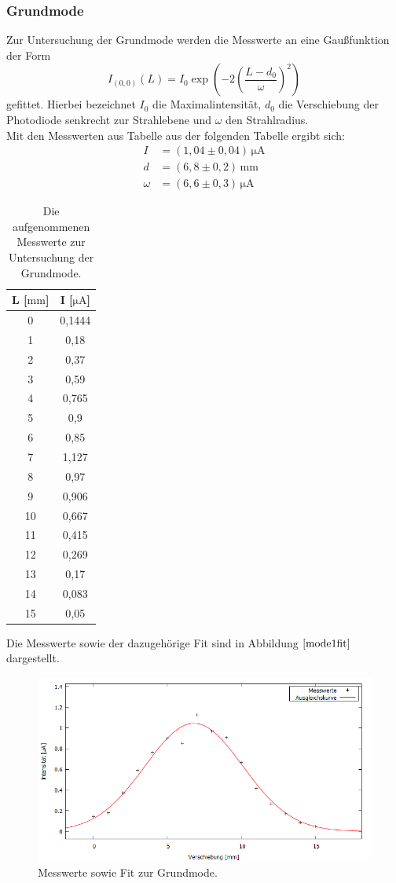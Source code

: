 \subsubsection{Grundmode}
Zur Untersuchung der Grundmode werden die Messwerte an eine Gaußfunktion der Form
\begin{equation}
\label{eqn:gauß}
  I_{(0, 0)}(L) = I_0\exp\left(-2\left(\frac{L - d_0}{\omega}\right)^2\right)
\end{equation}
gefittet. Hierbei bezeichnet $I_0$ die Maximalintensität, $d_0$ die Verschiebung der Photodiode senkrecht zur Strahlebene und $\omega$ den Strahlradius.\\
Mit den Messwerten aus Tabelle aus der folgenden Tabelle ergibt sich:
\begin{align*}
  I &=(1,04 \pm 0,04)\, \si{\micro\ampere}\\
  d &=(6,8 \pm 0,2)\, \si{\milli\meter}   \\
 \omega &=(6,6 \pm 0,3)\,  \si{\micro\ampere}
\end{align*}
\begin{table}
\begin{tabular}{c|c}
L [$ \si{\milli\meter}$]   &   I [$ \si{\micro\ampere}$]     \\
\hline
0  & 0,1444 \\
1  & 0,18   \\
2  & 0,37   \\
3  & 0,59   \\
4  & 0,765  \\
5  & 0,9    \\
6  & 0,85   \\
7  & 1,127  \\
8  & 0,97   \\
9  & 0,906  \\
10 & 0,667  \\
11 & 0,415  \\
12 & 0,269  \\
13 & 0,17   \\
14 & 0,083  \\
15 & 0,05
\end{tabular}
\caption{Die aufgenommenen Messwerte zur Untersuchung der Grundmode.}
\label{mode1}
\end{table}
Die Messwerte sowie der dazugehörige Fit sind in Abbildung $\ref{mode1fit}$ dargestellt.
\begin{figure}[H]
  \centering
  \includegraphics[width=14cm]{bilder/Grundmode.png}
  \caption{Messwerte sowie Fit zur Grundmode.}
  \label{mode1fit}
\end{figure}

